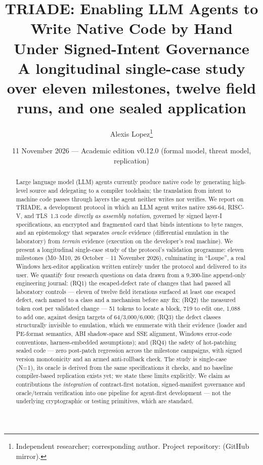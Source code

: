\documentclass[11pt,a4paper]{article}
\title{\textbf{TRIADE: Enabling LLM Agents to Write Native Code by Hand\\
Under Signed-Intent Governance\\
\large A longitudinal single-case study over eleven milestones, twelve field
runs, and one sealed application}}
\author{Alexis Lopez\thanks{Independent researcher; corresponding author.
Project repository: \code{alexisfrlopez-debug/triade} (GitHub mirror).}}
\date{11 November 2026 — Academic edition v0.12.0 (formal model, threat model, replication)}
\begin{document}
\maketitle
\thispagestyle{fancy}

\begin{abstract}
\noindent Large language model (LLM) agents currently produce native code by
generating high-level source and delegating to a compiler toolchain; the
translation from intent to machine code passes through layers the agent
neither writes nor verifies. We report on TRIADE, a development protocol in
which an LLM agent writes native x86-64, RISC-V, and TLS~1.3 code
\emph{directly as assembly notation}, governed by signed layer-I
specifications, an encrypted and fragmented card that binds intentions to
byte ranges, and an epistemology that separates \emph{oracle} evidence
(differential emulation in the laboratory) from \emph{terrain} evidence
(execution on the developer's real machine). We present a longitudinal
single-case study of the protocol's validation programme: eleven milestones
(M0--M10, 26 October -- 11 November 2026), culminating in ``Loupe'', a real
Windows hex-editor application written entirely under the protocol and
delivered to its user. We quantify four research questions on data drawn
from a 9{,}300-line append-only engineering journal: (RQ1) the
escaped-defect rate of changes that had passed all laboratory controls ---
eleven of twelve field iterations surfaced at least one escaped defect,
each named to a class and a mechanism before any fix; (RQ2) the measured
token cost per validated change --- 51 tokens to locate a block, 719 to
edit one, 1{,}088 to add one, against design targets of 64/3{,}000/6{,}000;
(RQ3) the defect classes structurally invisible to emulation, which we
enumerate with their evidence (loader and PE-format semantics, ABI
shadow-space and SSE alignment, Windows error-code conventions,
harness-embedded assumptions); and (RQ4) the safety of hot-patching sealed
code --- zero post-patch regression across the milestone campaigns, with
signed version monotonicity and an armed anti-rollback check. The study is
single-case (N=1), its oracle is derived from the same specifications it
checks, and no baseline compiler-based replication exists yet; we state
these limits explicitly. We claim as contributions the \emph{integration}
of contract-first notation, signed-manifest governance and oracle/terrain
verification into one pipeline for agent-first development --- not the
underlying cryptographic or testing primitives, which are standard.
\end{abstract}
\end{document}
